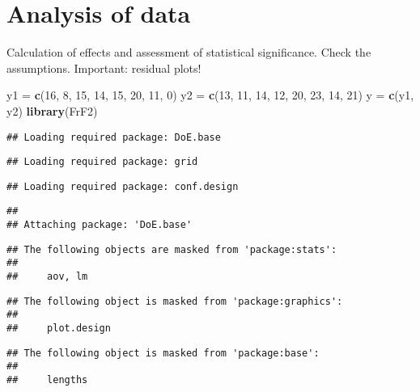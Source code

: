 \documentclass[]{article}
\newenvironment{Shaded}{\begin{snugshade}}{\end{snugshade}}
\newcommand{\KeywordTok}[1]{\textcolor[rgb]{0.13,0.29,0.53}{\textbf{#1}}}
\newcommand{\DecValTok}[1]{\textcolor[rgb]{0.00,0.00,0.81}{#1}}
\newcommand{\StringTok}[1]{\textcolor[rgb]{0.31,0.60,0.02}{#1}}
\newcommand{\NormalTok}[1]{#1}
\begin{document}
\section{Analysis of data}\label{analysis-of-data}

Calculation of effects and assessment of statistical significance. Check
the assumptions. Important: residual plots!

\begin{Shaded}
\begin{Highlighting}[]
\NormalTok{y1 =}\StringTok{ }\KeywordTok{c}\NormalTok{(}\DecValTok{16}\NormalTok{, }\DecValTok{8}\NormalTok{, }\DecValTok{15}\NormalTok{, }\DecValTok{14}\NormalTok{, }\DecValTok{15}\NormalTok{, }\DecValTok{20}\NormalTok{, }\DecValTok{11}\NormalTok{, }\DecValTok{0}\NormalTok{)}
\NormalTok{y2 =}\StringTok{ }\KeywordTok{c}\NormalTok{(}\DecValTok{13}\NormalTok{, }\DecValTok{11}\NormalTok{, }\DecValTok{14}\NormalTok{, }\DecValTok{12}\NormalTok{, }\DecValTok{20}\NormalTok{, }\DecValTok{23}\NormalTok{, }\DecValTok{14}\NormalTok{, }\DecValTok{21}\NormalTok{)}
\NormalTok{y =}\StringTok{ }\KeywordTok{c}\NormalTok{(y1, y2)}
\KeywordTok{library}\NormalTok{(FrF2)}
\end{Highlighting}
\end{Shaded}

\begin{verbatim}
## Loading required package: DoE.base
\end{verbatim}

\begin{verbatim}
## Loading required package: grid
\end{verbatim}

\begin{verbatim}
## Loading required package: conf.design
\end{verbatim}

\begin{verbatim}
## 
## Attaching package: 'DoE.base'
\end{verbatim}

\begin{verbatim}
## The following objects are masked from 'package:stats':
## 
##     aov, lm
\end{verbatim}

\begin{verbatim}
## The following object is masked from 'package:graphics':
## 
##     plot.design
\end{verbatim}

\begin{verbatim}
## The following object is masked from 'package:base':
## 
##     lengths
\end{verbatim}
\end{document}
